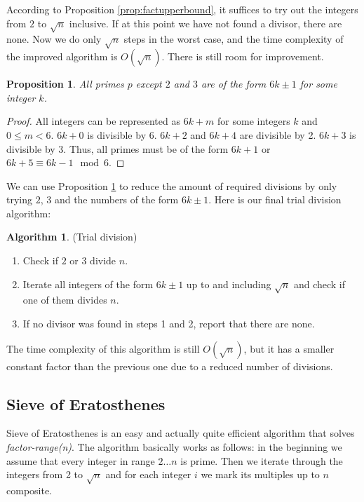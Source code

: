 \documentclass[12pt] {article}
\theoremstyle{plain}
\newtheorem{prop}[thm]{Proposition}
\theoremstyle{definition}
\newtheorem{algo}[thm]{Algorithm}
\begin{document}
According to Proposition \ref{prop:factupperbound}, it suffices to try out the integers from $2$ to $\sqrt{n}$ inclusive. If at this point we have not found a divisor, there are none. Now we do only $\sqrt{n}$ steps in the worst case, and the time complexity of the improved algorithm is $O(\sqrt{n})$. There is still room for improvement.

\begin{prop}
\label {prop:primes6pm1}
All primes $p$ except $2$ and $3$ are of the form $6k \pm 1$ for some integer $k$.
\end{prop}

\begin{proof}
All integers can be represented as $6k + m$ for some integers $k$ and $0 \leq m < 6$. $6k + 0$ is divisible by 6. $6k + 2$ and $6k + 4$ are divisible by 2. $6k + 3$ is divisible by 3. Thus, all primes must be of the form $6k + 1$ or $6k + 5 \equiv 6k - 1 \mod 6$.
\end{proof}

We can use Proposition \ref{prop:primes6pm1} to reduce the amount of required divisions by only trying $2$, $3$ and the numbers of the form $6k \pm 1$. Here is our final trial division algorithm:
\begin{algo} (Trial division)
\begin{enumerate}
\item Check if $2$ or $3$ divide $n$.
\item Iterate all integers of the form $6k \pm 1$ up to and including $\sqrt{n}$ and check if one of them divides $n$.
\item If no divisor was found in steps 1 and 2, report that there are none.
\end{enumerate}
\end{algo}

The time complexity of this algorithm is still $O(\sqrt{n})$, but it has a smaller constant factor than the previous one due to a reduced number of divisions.

\subsection {Sieve of Eratosthenes}

Sieve of Eratosthenes is an easy and actually quite efficient algorithm that solves \textit{factor-range(n)}. The algorithm basically works as follows: in the beginning we assume that every integer in range $2 \dots n$ is prime. Then we iterate through the integers from 2 to $\sqrt{n}$ and for each integer $i$ we mark its multiples up to $n$ composite.
\end{document}
